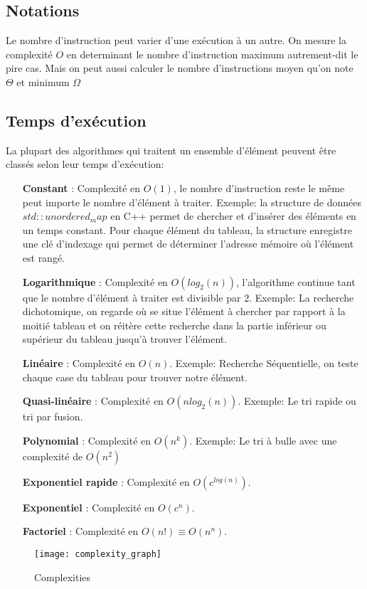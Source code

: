 \documentclass[11pt]{extarticle}
\begin{document}
\subsection{Notations}
Le nombre d'instruction peut varier d'une exécution à un autre. On mesure la complexité $O$ en determinant le nombre d'instruction maximum autrement-dit le pire cas. Mais on peut aussi calculer le nombre d'instructions moyen qu'on note $\Theta$ et minimum $\Omega$
\subsection{Temps d'exécution}
La plupart des algorithmes qui traitent un ensemble d'élément peuvent être classés selon leur temps d'exécution:
\begin{itemize}
\item[\textbf{Constant}]: Complexité en $O(1)$, le nombre d'instruction reste le même peut importe le nombre d'élément à traiter. Exemple: la structure de données $std::unordered_map$ en C++ permet de chercher et d'insérer des éléments en un temps constant. Pour chaque élément du tableau, la structure enregistre une clé d'indexage qui permet de déterminer l'adresse mémoire où l'élément est rangé.
\item[\textbf{Logarithmique}]: Complexité en $O(log_2(n))$, l'algorithme continue tant que le nombre d'élément à traiter est divisible par 2. Exemple: La recherche dichotomique, on regarde où se situe l'élément à chercher par rapport à la moitié tableau et on réitère cette recherche dans la partie inférieur ou supérieur du tableau jusqu'à trouver l'élément.
\item[\textbf{Linéaire}]: Complexité en $O(n)$. Exemple: Recherche Séquentielle, on teste chaque case du tableau pour trouver notre élément.
\item[\textbf{Quasi-linéaire}]: Complexité en $O(n log_2(n))$. Exemple: Le tri rapide ou tri par fusion.
\item[\textbf{Polynomial}]: Complexité en $O(n^k)$. Exemple: Le tri à bulle avec une complexité de $O(n^2)$
\item[\textbf{Exponentiel rapide}]: Complexité en $O(c^{log(n)})$.
\item[\textbf{Exponentiel}]: Complexité en $O(c^n)$.
\item[\textbf{Factoriel}]: Complexité en $O(n!) \equiv O(n^n)$.
\end{itemize}
\vspace{1cm}
\begin{figure}[h]
\begin{center}
\texttt{[image: complexity\_graph]}
\end{center}
\caption{Complexities}
\end{figure}
\newpage
\end{document}
